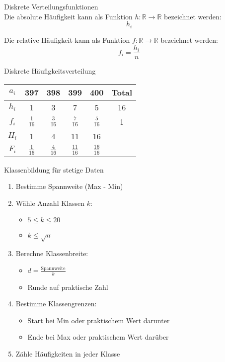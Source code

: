\begin{definition}{Diskrete Verteilungsfunktionen}\\
Die absolute Häufigkeit kann als Funktion $h: \mathbb{R} \rightarrow \mathbb{R}$ bezeichnet werden:
$$h_i$$

Die relative Häufigkeit kann als Funktion $f: \mathbb{R} \rightarrow \mathbb{R}$ bezeichnet werden:
$$f_i = \frac{h_i}{n}$$

\begin{example}{Diskrete Häufigkeitsverteilung}\\
\renewcommand{\arraystretch}{2}%
\begin{center}
\begin{tabular}{|c|c|c|c|c|c|}
\hline
$a_i$ & 397 & 398 & 399 & 400 & Total \\
\hline
$h_i$ & 1 & 3 & 7 & 5 & 16 \\
\hline
$f_i$ & $\frac{1}{16}$ & $\frac{3}{16}$ & $\frac{7}{16}$ & $\frac{5}{16}$ & 1 \\
\hline
$H_i$ & 1 & 4 & 11 & 16 & \\
\hline
$F_i$ & $\frac{1}{16}$ & $\frac{4}{16}$ & $\frac{11}{16}$ & $\frac{16}{16}$ & \\
\hline
\end{tabular}
\end{center}
\end{example}
\end{definition}

\begin{KR}{Klassenbildung für stetige Daten}
\begin{enumerate}
    \item Bestimme Spannweite (Max - Min)
    \item Wähle Anzahl Klassen $k$:
        \begin{itemize}
            \item $5 \leq k \leq 20$
            \item $k \leq \sqrt{n}$
        \end{itemize}
    \item Berechne Klassenbreite:
        \begin{itemize}
            \item $d = \frac{\text{Spannweite}}{k}$
            \item Runde auf praktische Zahl
        \end{itemize}
    \item Bestimme Klassengrenzen:
        \begin{itemize}
            \item Start bei Min oder praktischem Wert darunter
            \item Ende bei Max oder praktischem Wert darüber
        \end{itemize}
    \item Zähle Häufigkeiten in jeder Klasse
\end{enumerate}
\end{KR}

